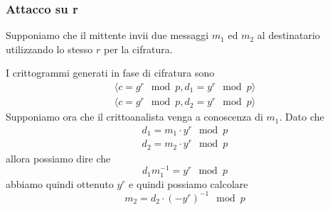 \subsubsection{Attacco su r}
Supponiamo che il mittente invii due messaggi $m_1$ ed $m_2$ al destinatario utilizzando lo stesso $r$ per la
cifratura.

I crittogrammi generati in fase di cifratura sono
\[
	\begin{matrix}
		\langle c = g^r \mod{p}, d_1 = y^r \mod{p} \rangle \\
		\langle c = g^r \mod{p}, d_2 = y^r \mod{p} \rangle
	\end{matrix}
\]
Supponiamo ora che il crittoanalista venga a conoscenza di $m_1$. Dato che
\[
	\begin{matrix}
		d_1 = m_1 \cdot y^r \mod{p} \\
		d_2 = m_2 \cdot y^r \mod{p}
	\end{matrix}
\]
allora possiamo dire che
\[ d_1 m_1^{-1} = y^r \mod{p} \]
abbiamo quindi ottenuto $y^r$ e quindi possiamo calcolare
\[ m_2 = d_2 \cdot (-y^r)^{-1} \mod{p} \]